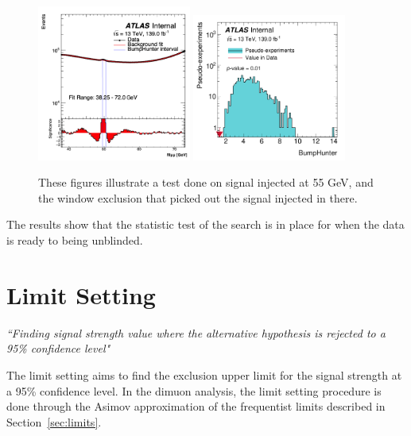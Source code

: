 \begin{figure}[!htb]
    \begin{center}
        \includegraphics[width=0.45\textwidth]{figures/chapter_dimuon/SearchBump}
        \includegraphics[width=0.45\textwidth]{figures/chapter_dimuon/bumpHunterStatPlot_bump}
        \caption{
        These figures illustrate a test done on signal injected at 55 GeV, and the window exclusion that picked out the signal injected in there.}
        \label{fig:searchbump}
    \end{center}
\end{figure}
\FloatBarrier

The results show that the statistic test of the search is in place for when the data is ready to being unblinded.

\section{Limit Setting}

\textit{``Finding signal strength value where the alternative hypothesis is rejected to a 95\% confidence level"}

The limit setting aims to find the exclusion upper limit for the signal strength at a 95\% confidence level. In the dimuon analysis, the limit setting procedure is done through the Asimov approximation of the frequentist limits described in Section~\ref{sec:limits}.

